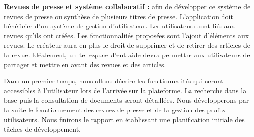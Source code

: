     \textbf{Revues de presse et système collaboratif :} afin de développer ce système de revues de presse ou synthèse de plusieurs titres de presse. L’application doit bénéficier d’un
    système de gestion d’utilisateur. Les utilisateurs sont liés aux revues qu’ils ont créées. Les fonctionnalités proposées sont l’ajout d'éléments
    aux revues. Le créateur aura en plus le droit de supprimer et de retirer des articles de la revue. Idéalement, un tel espace d’entraide devra permettre
    aux utilisateurs de partager et mettre en avant des revues et des articles.

    Dans un premier temps, nous allons décrire les fonctionnalités qui seront accessibles à l'utilisateur lors de l'arrivée sur la plateforme. La recherche dans la base puis la consultation de documents seront détaillées. Nous développerons par la suite le fonctionnement des revues de presse et de la gestion des profils utilisateurs. Nous finirons le rapport en établissant une planification initiale des tâches de développement.